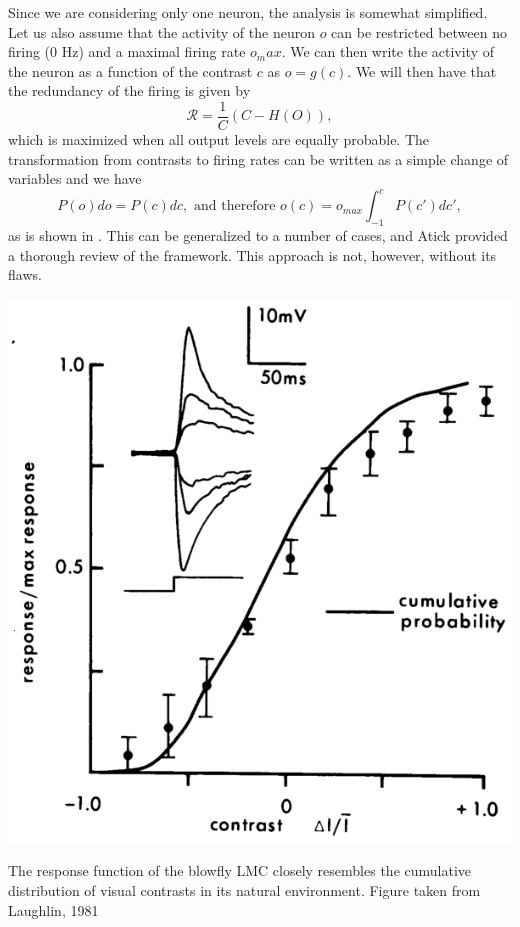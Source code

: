 Since we are considering only one neuron, the analysis is somewhat simplified. Let us also assume that the activity of the neuron $o$ can be restricted between no firing ($0$ Hz) and a maximal firing rate $o_max$. We can then write the activity of the neuron as a function of the contrast $c$ as $o = g(c)$. We will then have that the redundancy of the firing is given by
$$
\mathcal{R} = \frac{1}{C} \left(C - H(O) \right),
$$
which is maximized when all output levels are equally probable. The transformation from contrasts to firing rates can be written as a simple change of variables and we have
$$
P(o) do = P(c) dc, \textrm{ and therefore } o(c) = o_{max} \int_{-1}^c P(c') dc',
$$
as is shown in . This can be generalized to a number of cases, and Atick\cite{Atick1992} provided a thorough review of the framework. This approach is not, however, without its flaws.

\begin{marginfigure}
\includegraphics[width=\columnwidth]{figures/laughlin_81.eps}
\label{fig:laughlin}
\caption{The response function of the blowfly LMC closely resembles the cumulative distribution of visual contrasts in its natural environment. Figure taken from Laughlin, 1981}
\end{marginfigure}

